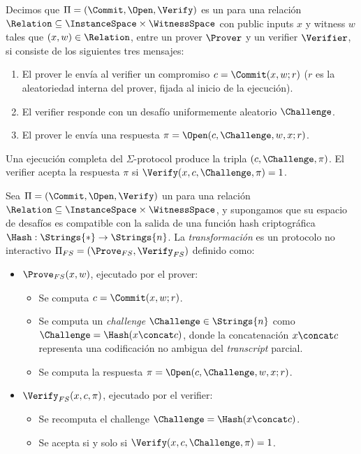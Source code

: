 \begin{definition}[\SigmaProtocol]
	Decimos que $\Pi = (\Commit, \Open, \Verify)$ es un \SigmaProtocol para una relación $\Relation \subseteq \InstanceSpace \times \WitnessSpace$ con public inputs $x$ y witness $w$ tales que $(x,w) \in \Relation$, entre un prover $\Prover$ y un verifier $\Verifier$, si consiste de los siguientes tres mensajes:
	\begin{enumerate}[itemsep=0.1 cm]
		\item El prover le envía al verifier un compromiso $c = \Commit(x, w; r)$ ($r$ es la aleatoriedad interna del prover, fijada al inicio de la ejecución).
		\item El verifier responde con un desafío uniformemente aleatorio $\Challenge$.
		\item El prover le envía una respuesta $\pi = \Open(c, \Challenge, w, x; r)$.
	\end{enumerate}
	Una ejecución completa del $\Sigma$-protocol produce la tripla $(c, \Challenge, \pi)$. El verifier acepta la respuesta $\pi$ si $\Verify(x, c, \Challenge, \pi) = 1$.
\end{definition}

\begin{definition}
	Sea $\Pi = (\Commit, \Open, \Verify)$ un \SigmaProtocol para una relación $\Relation \subseteq \InstanceSpace \times \WitnessSpace$, y supongamos que su espacio de desafíos es compatible con la salida de una función hash criptográfica $\Hash: \Strings{*} \to \Strings{n}$. La \emph{transformación \FiatShamir} es un protocolo no interactivo $\Pi_{FS} = (\Prove_{FS}, \Verify_{FS})$ definido como:
	\begin{itemize}[noitemsep]
		\item $\Prove_{FS}(x,w)$, ejecutado por el prover:
		\begin{itemize}[noitemsep]
			\item Se computa $c = \Commit(x,w;r)$.
			\item Se computa un \textit{challenge} $\Challenge \in \Strings{n}$ como $\Challenge = \Hash(x \concat c)$, donde la concatenación $x \concat c$ representa una codificación no ambigua del \textit{transcript} parcial.
			\item Se computa la respuesta $\pi = \Open(c, \Challenge, w, x; r)$.
		\end{itemize}
		\item $\Verify_{FS}(x,c,\pi)$, ejecutado por el verifier:
		\begin{itemize}[noitemsep]
			\item Se recomputa el challenge $\Challenge = \Hash(x \concat c)$.
			\item Se acepta si y solo si $\Verify(x,c,\Challenge,\pi) = 1$.
		\end{itemize}
	\end{itemize}
\end{definition}

